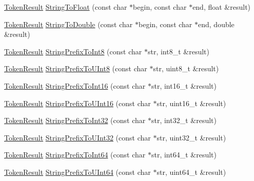 \begin{DoxyCompactItemize}
\item 
\hyperlink{namespacemage_a2178ba2411db5912f41b2e7698c2037d}{Token\+Result} \hyperlink{namespacemage_a8610747ad641d27135bcd3a3d3c6b6c2}{String\+To\+Float} (const char $\ast$begin, const char $\ast$end, float \&result)
\item 
\hyperlink{namespacemage_a2178ba2411db5912f41b2e7698c2037d}{Token\+Result} \hyperlink{namespacemage_aaee12fa175aece0a6ffbaa8df4e63b60}{String\+To\+Double} (const char $\ast$begin, const char $\ast$end, double \&result)
\item 
\hyperlink{namespacemage_a2178ba2411db5912f41b2e7698c2037d}{Token\+Result} \hyperlink{namespacemage_ab2a4f965199e2efba23cbbd052a66283}{String\+Prefix\+To\+Int8} (const char $\ast$str, int8\+\_\+t \&result)
\item 
\hyperlink{namespacemage_a2178ba2411db5912f41b2e7698c2037d}{Token\+Result} \hyperlink{namespacemage_ace3c30c1b0e1eddafc8f14335223c46b}{String\+Prefix\+To\+U\+Int8} (const char $\ast$str, uint8\+\_\+t \&result)
\item 
\hyperlink{namespacemage_a2178ba2411db5912f41b2e7698c2037d}{Token\+Result} \hyperlink{namespacemage_a8ad9257753f5f5288f8e09b2c99e544e}{String\+Prefix\+To\+Int16} (const char $\ast$str, int16\+\_\+t \&result)
\item 
\hyperlink{namespacemage_a2178ba2411db5912f41b2e7698c2037d}{Token\+Result} \hyperlink{namespacemage_a59f623733dd4ad636de4cea46467da7d}{String\+Prefix\+To\+U\+Int16} (const char $\ast$str, uint16\+\_\+t \&result)
\item 
\hyperlink{namespacemage_a2178ba2411db5912f41b2e7698c2037d}{Token\+Result} \hyperlink{namespacemage_a6fbea19380a6886e4e84f45d86d3379f}{String\+Prefix\+To\+Int32} (const char $\ast$str, int32\+\_\+t \&result)
\item 
\hyperlink{namespacemage_a2178ba2411db5912f41b2e7698c2037d}{Token\+Result} \hyperlink{namespacemage_a7843190a71ad080e1ae5e5f1ca518db9}{String\+Prefix\+To\+U\+Int32} (const char $\ast$str, uint32\+\_\+t \&result)
\item 
\hyperlink{namespacemage_a2178ba2411db5912f41b2e7698c2037d}{Token\+Result} \hyperlink{namespacemage_a8fda775d2c9f4f0a465d566540e91e82}{String\+Prefix\+To\+Int64} (const char $\ast$str, int64\+\_\+t \&result)
\item 
\hyperlink{namespacemage_a2178ba2411db5912f41b2e7698c2037d}{Token\+Result} \hyperlink{namespacemage_ae0ffd357b75c2e9321dcf44c00f1b607}{String\+Prefix\+To\+U\+Int64} (const char $\ast$str, uint64\+\_\+t \&result)
\item 

\end{DoxyCompactItemize}
